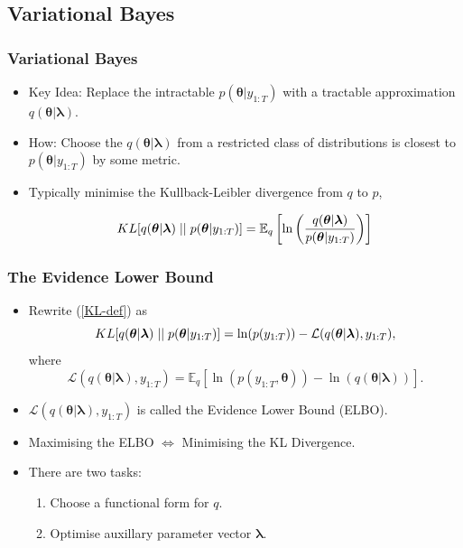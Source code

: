 \documentclass{beamer}\usepackage[]{graphicx}\usepackage[]{color}
\begin{document}
\begin{frame}
\section{Variational Bayes}
\frametitle{Variational Bayes}
\begin{itemize}
\item Key Idea: Replace the intractable $p(\boldsymbol{\theta} | y_{1:T})$ with a tractable approximation $q(\boldsymbol{\theta} | \boldsymbol{\lambda})$.
\item How: Choose the $q(\boldsymbol{\theta} | \boldsymbol{\lambda})$ from a restricted class of distributions is closest to $p(\boldsymbol{\theta} | y_{1:T})$ by some metric. 
\item Typically minimise the Kullback-Leibler divergence from $q$ to $p$,

\begin{equation}
\label{KL-def}
KL[q(\boldsymbol{\theta} | \boldsymbol{\lambda})\hspace{.1cm}||\hspace{.1cm}p(\boldsymbol{\theta} | y_{1:T})] = \mathbb{E}_q  \left[ \ln \left( \frac{q(\boldsymbol{\theta} | \boldsymbol{\lambda})}{p(\boldsymbol{\theta} |y_{1:T})}\right) \right]
\end{equation}
\end{itemize}
\end{frame}


\begin{frame}
\frametitle{The Evidence Lower Bound}
\begin{itemize}
\item Rewrite (\ref{KL-def}) as
\begin{equation}
\label{KL-ELBO}
KL[q(\boldsymbol{\theta} | \boldsymbol{\lambda})\hspace{.1cm}||\hspace{.1cm}p(\boldsymbol{\theta} |y_{1:T})] = \ln(p(y_{1:T})) - \mathcal{L}(q(\boldsymbol{\theta} | \boldsymbol{\lambda}), y_{1:T}),
\end{equation}
where
\begin{equation}
\label{ELBO}
\mathcal{L}(q(\boldsymbol{\theta} | \boldsymbol{\lambda}), y_{1:T}) = \mathbb{E}_{q} \left[ \ln (p(y_{1:T},\boldsymbol{\theta})) - \ln (q(\boldsymbol{\theta} | \boldsymbol{\lambda})) \right].
\end{equation}
\item $\mathcal{L}(q(\boldsymbol{\theta} | \boldsymbol{\lambda}), y_{1:T})$ is called the Evidence Lower Bound (ELBO).
\item Maximising the ELBO $\iff$ Minimising the KL Divergence.
\item There are two tasks: 
  \begin{enumerate}
  \item Choose a functional form for $q$. 
  \item Optimise auxillary parameter vector $\boldsymbol{\lambda}$. 
  \end{enumerate}
\end{itemize}
\end{frame}
\end{document}
